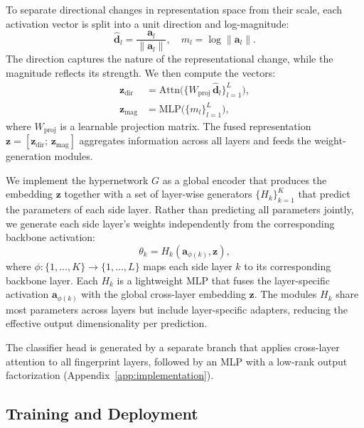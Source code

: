  To separate directional changes in representation space from their scale, each activation vector is split into a unit direction and log-magnitude:
\begin{equation}
    \hat{\mathbf{d}}_l = \frac{\mathbf{a}_l}{\|\mathbf{a}_l\|}, \quad m_l = \log \|\mathbf{a}_l\|.
\end{equation}
The direction captures the nature of the representational change, while the magnitude reflects its strength. We then compute the vectors:
\begin{align}
\mathbf{z}_\text{dir} &= \text{Attn}\big(\{W_\text{proj}\,\hat{\mathbf{d}}_l\}_{l=1}^L\big),\\
\mathbf{z}_\text{mag} &= \text{MLP}\big(\{m_l\}_{l=1}^L\big),
\end{align}
where $W_\text{proj}$ is a learnable projection matrix. The fused representation $\mathbf{z} = [\mathbf{z}_\text{dir};\, \mathbf{z}_\text{mag}]$ aggregates information across all layers and feeds the weight-generation modules.

 We implement the hypernetwork $G$ as a global encoder that produces the embedding $\mathbf{z}$ together with a set of layer-wise generators $\{H_k\}_{k=1}^K$ that predict the parameters of each side layer. Rather than predicting all parameters jointly, we generate each side layer's weights independently from the corresponding backbone activation:
\begin{equation}
    \theta_k = H_k(\mathbf{a}_{\phi(k)}, \mathbf{z}),
\end{equation}
where $\phi: \{1,\dots,K\} \rightarrow \{1,\dots,L\}$ maps each side layer $k$ to its corresponding backbone layer. Each $H_k$ is a lightweight MLP that fuses the layer-specific activation $\mathbf{a}_{\phi(k)}$ with the global cross-layer embedding $\mathbf{z}$. The modules $H_k$ share most parameters across layers but include layer-specific adapters, reducing the effective output dimensionality per prediction.

 The \ssn{} classifier head is generated by a separate branch that applies cross-layer attention to all fingerprint layers, followed by an MLP with a low-rank output factorization (Appendix~\ref{app:implementation}).

\subsection{Training and Deployment}
\label{sec:deploy}

